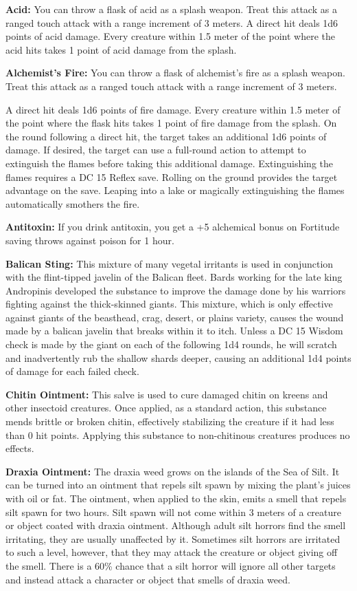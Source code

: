 \textbf{Acid:} You can throw a flask of acid as a splash weapon. Treat this attack as a ranged touch attack with a range increment of 3 meters. A direct hit deals 1d6 points of acid damage. Every creature within 1.5 meter of the point where the acid hits takes 1 point of acid damage from the splash.

\textbf{Alchemist's Fire:} You can throw a flask of alchemist's fire as a splash weapon. Treat this attack as a ranged touch attack with a range increment of 3 meters.

A direct hit deals 1d6 points of fire damage. Every creature within 1.5 meter of the point where the flask hits takes 1 point of fire damage from the splash. On the round following a direct hit, the target takes an additional 1d6 points of damage. If desired, the target can use a full-round action to attempt to extinguish the flames before taking this additional damage. Extinguishing the flames requires a DC 15 Reflex save. Rolling on the ground provides the target advantage on the save. Leaping into a lake or magically extinguishing the flames automatically smothers the fire.

\textbf{Antitoxin:} If you drink antitoxin, you get a +5 alchemical bonus on Fortitude saving throws against poison for 1 hour.

\textbf{Balican Sting:} This mixture of many vegetal irritants is used in conjunction with the flint-tipped javelin of the Balican fleet. Bards working for the late king Andropinis developed the substance to improve the damage done by his warriors fighting against the thick-skinned giants. This mixture, which is only effective against giants of the beasthead, crag, desert, or plains variety, causes the wound made by a balican javelin that breaks within it to itch. Unless a DC 15 Wisdom check is made by the giant on each of the following 1d4 rounds, he will scratch and inadvertently rub the shallow shards deeper, causing an additional 1d4 points of damage for each failed check.

\textbf{Chitin Ointment:} This salve is used to cure damaged chitin on kreens and other insectoid creatures. Once applied, as a standard action, this substance mends brittle or broken chitin, effectively stabilizing the creature if it had less than 0 hit points. Applying this substance to non-chitinous creatures produces no effects.

\textbf{Draxia Ointment:} The draxia weed grows on the islands of the Sea of Silt. It can be turned into an ointment that repels silt spawn by mixing the plant's juices with oil or fat. The ointment, when applied to the skin, emits a smell that repels silt spawn for two hours. Silt spawn will not come within 3 meters of a creature or object coated with draxia ointment. Although adult silt horrors find the smell irritating, they are usually unaffected by it. Sometimes silt horrors are irritated to such a level, however, that they may attack the creature or object giving off the smell. There is a 60\% chance that a silt horror will ignore all other targets and instead attack a character or object that smells of draxia weed.

